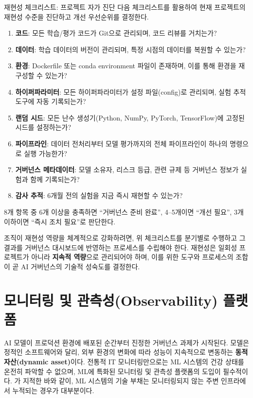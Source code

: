 \begin{practicaltool}{재현성 체크리스트: 프로젝트 자가 진단}
다음 체크리스트를 활용하여 현재 프로젝트의 재현성 수준을 진단하고 개선 우선순위를 결정한다.

\begin{enumerate}
    \item \textbf{코드}: 모든 학습/평가 코드가 Git으로 관리되며, 코드 리뷰를 거치는가?
    \item \textbf{데이터}: 학습 데이터의 버전이 관리되며, 특정 시점의 데이터를 복원할 수 있는가?
    \item \textbf{환경}: Dockerfile 또는 conda environment 파일이 존재하며, 이를 통해 환경을 재구성할 수 있는가?
    \item \textbf{하이퍼파라미터}: 모든 하이퍼파라미터가 설정 파일(config)로 관리되며, 실험 추적 도구에 자동 기록되는가?
    \item \textbf{랜덤 시드}: 모든 난수 생성기(Python, NumPy, PyTorch, TensorFlow)에 고정된 시드를 설정하는가?
    \item \textbf{파이프라인}: 데이터 전처리부터 모델 평가까지의 전체 파이프라인이 하나의 명령으로 실행 가능한가?
    \item \textbf{거버넌스 메타데이터}: 모델 소유자, 리스크 등급, 관련 규제 등 거버넌스 정보가 실험과 함께 기록되는가?
    \item \textbf{감사 추적}: 6개월 전의 실험을 지금 즉시 재현할 수 있는가?
\end{enumerate}

8개 항목 중 6개 이상을 충족하면 ``거버넌스 준비 완료'', 4--5개이면 ``개선 필요'', 3개 이하이면 ``즉시 조치 필요''로 판단한다.
\end{practicaltool}

조직이 재현성 역량을 체계적으로 강화하려면, 위 체크리스트를 분기별로 수행하고 그 결과를 거버넌스 대시보드에 반영하는 프로세스를 수립해야 한다. 재현성은 일회성 프로젝트가 아니라 \textbf{지속적 역량}으로 관리되어야 하며, 이를 위한 도구와 프로세스의 조합이 곧 AI 거버넌스의 기술적 성숙도를 결정한다.


\section{모니터링 및 관측성(Observability) 플랫폼}
\label{sec:14.3}

AI 모델이 프로덕션 환경에 배포된 순간부터 진정한 거버넌스 과제가 시작된다. 모델은 정적인 소프트웨어와 달리, 외부 환경의 변화에 따라 성능이 지속적으로 변동하는 \textbf{동적 자산(dynamic asset)}이다. 전통적 IT 모니터링만으로는 ML 시스템의 건강 상태를 온전히 파악할 수 없으며, ML에 특화된 모니터링 및 관측성 플랫폼의 도입이 필수적이다. \cite{sculley2015hidden}가 지적한 바와 같이, ML 시스템의 기술 부채는 모니터링되지 않는 주변 인프라에서 누적되는 경우가 대부분이다.

